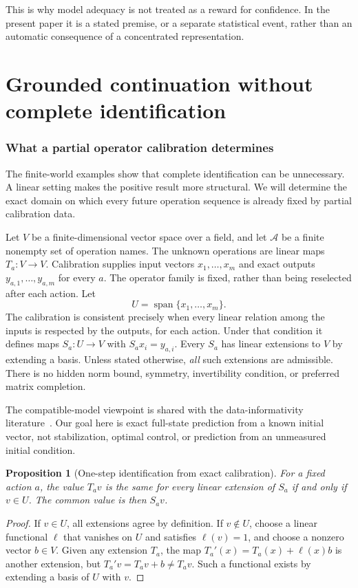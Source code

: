 \documentclass[11pt,letterpaper]{article}
\theoremstyle{plain}
\newtheorem{proposition}[theorem]{Proposition}
\theoremstyle{definition}
\newcommand{\A}{\mathcal A}\newcommand{\C}{\mathcal C}\newcommand{\E}{\mathcal E}
\newcommand{\Span}{\operatorname{span}}\newcommand{\Pow}{\mathcal P}
\begin{document}
This is why model adequacy is not treated as a reward for confidence. In the present paper it is a stated premise, or a separate statistical event, rather than an automatic consequence of a concentrated representation.

\FloatBarrier\clearpage
\part{Grounded continuation without complete identification}
\section{What a partial operator calibration determines}\label{sec:linear}
The finite-world examples show that complete identification can be unnecessary. A linear setting makes the positive result more structural. We will determine the exact domain on which every future operation sequence is already fixed by partial calibration data.

Let $V$ be a finite-dimensional vector space over a field, and let $\A$ be a finite nonempty set of operation names. The unknown operations are linear maps $T_a:V\to V$. Calibration supplies input vectors $x_1,\ldots,x_m$ and exact outputs $y_{a,1},\ldots,y_{a,m}$ for every $a$. The operator family is fixed, rather than being reselected after each action. Let
\[
U=\Span\{x_1,\ldots,x_m\}.
\]
The calibration is consistent precisely when every linear relation among the inputs is respected by the outputs, for each action. Under that condition it defines maps $S_a:U\to V$ with $S_ax_i=y_{a,i}$. Every $S_a$ has linear extensions to $V$ by extending a basis. Unless stated otherwise, \emph{all} such extensions are admissible. There is no hidden norm bound, symmetry, invertibility condition, or preferred matrix completion.

The compatible-model viewpoint is shared with the data-informativity literature~\cite{informativity}. Our goal here is exact full-state prediction from a known initial vector, not stabilization, optimal control, or prediction from an unmeasured initial condition.

\begin{proposition}[One-step identification from exact calibration]\label{prop:onestep}
For a fixed action $a$, the value $T_av$ is the same for every linear extension of $S_a$ if and only if $v\in U$. The common value is then $S_av$.
\end{proposition}
\begin{proof}
If $v\in U$, all extensions agree by definition. If $v\notin U$, choose a linear functional $\ell$ that vanishes on $U$ and satisfies $\ell(v)=1$, and choose a nonzero vector $b\in V$. Given any extension $T_a$, the map $T_a'(x)=T_a(x)+\ell(x)b$ is another extension, but $T_a'v=T_av+b\ne T_av$. Such a functional exists by extending a basis of $U$ with $v$.
\end{proof}
\end{document}
